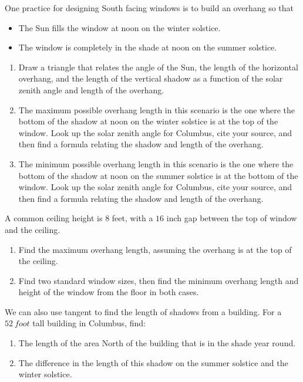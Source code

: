 \documentclass[noauthor,nooutcomes,handout,hints,12pt]{ximera}
\begin{document}
\mynewpage


\begin{question}
 One practice for designing South facing windows is to build an
 overhang so that
 \begin{itemize}
 \item The Sun fills the window at noon on the winter solstice.
 \item The window is completely in the shade at noon on the summer
   solstice.
 \end{itemize}
\begin{enumerate}
\item Draw a triangle that relates the angle of the Sun, the length of
  the horizontal overhang, and the length of the vertical shadow as a
  function of the solar zenith angle and length of the overhang.
\item The maximum possible overhang length in this scenario is the one
  where the bottom of the shadow at noon on the winter solstice is at
  the top of the window. Look up the solar zenith angle for Columbus,
  cite your source, and then find a formula relating the shadow and
  length of the overhang.
\item The minimum possible overhang length in this scenario is the one
  where the bottom of the shadow at noon on the summer solstice is at
  the bottom of the window. Look up the solar zenith angle for Columbus, cite
  your source, and then find a formula relating the shadow and length
  of the overhang.
\end{enumerate}
\end{question}
\mynewpage


\begin{question}
 A common ceiling height is $8$ feet, with a $16$ inch gap between the
 top of window and the ceiling.
 
\begin{enumerate}
 \item Find the maximum overhang length, assuming the overhang is at
   the top of the ceiling.
 \item Find two standard window sizes, then find the minimum overhang
   length and height of the window from the floor in both cases.
\end{enumerate}
\end{question}
\mynewpage

\begin{question}
 We can also use tangent to find the length of shadows from a
 building. For a $52\ foot$ tall building in Columbus, find:
 
\begin{enumerate}
 \item The length of the area North of the building that is in the
   shade year round.
 \item The difference in the length of this shadow on the summer
   solstice and the winter solstice.
\end{enumerate}
\end{question}
\end{document}
